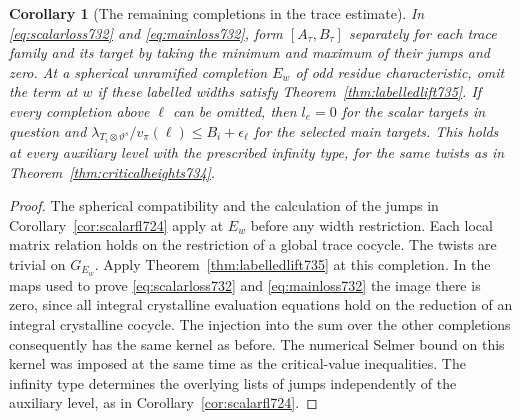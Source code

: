 \documentclass[a4paper,11pt]{article}
\newtheorem{corollary}[proposition]{Corollary}
\theoremstyle{definition}
\theoremstyle{remark}
\numberwithin{equation}{section}
\begin{document}
\begin{corollary}[The remaining completions in the trace estimate]\leavevmode
\label{cor:labelledtrace735}
In \eqref{eq:scalarloss732} and \eqref{eq:mainloss732}, form
\([A_\tau,B_\tau]\) separately for each trace family and its target
by taking the minimum and maximum of their jumps and zero. At a
spherical unramified completion \(E_w\) of odd residue characteristic,
omit the term at \(w\) if these labelled widths satisfy
Theorem~\ref{thm:labelledlift735}. If every completion above \(\ell\)
can be omitted, then \(l_e=0\) for the scalar targets in question
and \(\lambda_{T_i\otimes\vartheta^s}/v_\pi(\ell)
\le B_i+\epsilon_\ell\) for the selected main targets. This holds
at every auxiliary level with the prescribed infinity type, for
the same twists as in Theorem~\ref{thm:criticalheights734}.
\end{corollary}
\begin{proof}
The spherical compatibility and the calculation of the jumps in
Corollary~\ref{cor:scalarfl724} apply at \(E_w\) before any width
restriction. Each local matrix relation holds on the restriction
of a global trace cocycle. The twists are trivial on \(G_{E_w}\).
Apply Theorem~\ref{thm:labelledlift735} at this completion. In the
maps used to prove \eqref{eq:scalarloss732} and
\eqref{eq:mainloss732} the image there is zero, since all integral
crystalline evaluation equations hold on the reduction of an
integral crystalline cocycle. The injection into the sum over
the other completions consequently has the same kernel as before.
The numerical Selmer bound on this kernel was imposed at the
same time as the critical-value inequalities. The infinity type
determines the overlying lists of jumps independently of the
auxiliary level, as in Corollary~\ref{cor:scalarfl724}.
\end{proof}
\end{document}
